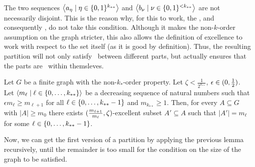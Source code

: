         \begin{remark}
            The two sequences $\left< a_\eta \mid \eta \in \{ 0,1 \}^{k_{**}} \right>$ and $\left< b_\nu \mid \nu \in \{ 0,1 \}^{<k_{**}} \right>$
            are not necessarily disjoint.
            This is the reason why, for this to work, the , and consequently ,
            do not take this condition.
            Although it makes the non-$k$-order assumption on the graph stricter, this also allows the definition of excellence
            to work with respect to the set itself (as it is good by definition).
            Thus, the resulting partition will not only satisfy \regularity~between different parts, but actually ensures
            that the parts are \regular~within themsleves.
        \end{remark}

        \begin{lemma}[Claim 5.4.1] \label{lem:existance_of_excellent_subsets_fixed_size_choices}
            Let $G$ be a finite graph with the non-$k_{*}$-order property.
            Let $\zeta < \frac{1}{2^{k_{**}}}$, $\epsilon \in ( 0, \frac{1}{2} )$.
            Let $\left< m_\ell \mid \ell \in \{ 0, \dots, k_{**} \} \right>$ be a decreasing sequence of natural numbers such that
            $\epsilon m_{\ell} \geq m_{\ell+1}$ for all $\ell \in \{ 0, \dots, k_{**}-1 \}$ and $m_{k_{**}} \geq 1$.
            Then, for every $A \subseteq G$ with $|A| \geq m_0$ there exists
            $( \frac{m_{\ell+1}}{m_{\ell}}, \zeta )$-excellent subset $A' \subseteq A$ such that $|A'| = m_\ell$ for
            some $\ell \in \{ 0, \dots, k_{**}-1 \}$.
        \end{lemma}

        Now, we can get the first version of a partition by applying the previous lemma recursively, until the remainder is too
        small for the condition on the size of the graph to be satisfied.


